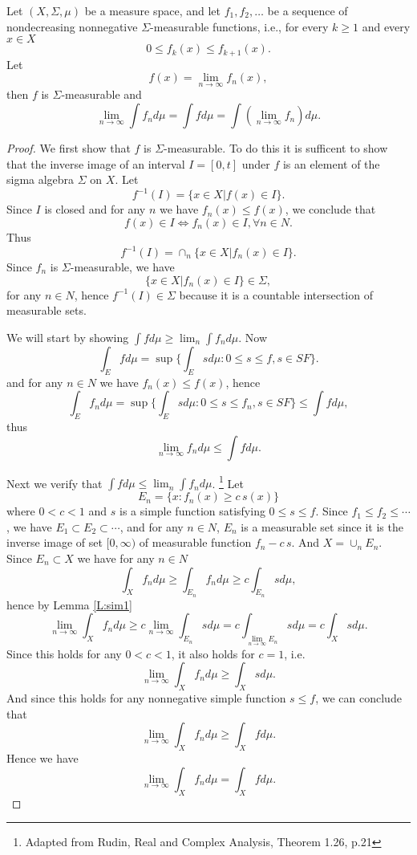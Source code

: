 \begin{theorem}  \label{T:MON}
Let $(X,\Sigma,\mu)$ be a measure space, and let $f_1,f_2,\dots$ be a sequence
of nondecreasing nonnegative $\Sigma$-measurable functions, i.e., for every 
$k\ge 1$ and every $x\in X$
\[
  0\le f_k(x) \le f_{k+1}(x).
\]
Let 
\[
  f(x) = \lim_{n\to\infty} f_n(x),
\]
then $f$ is $\Sigma$-measurable and
\begin{equation}
  \lim_{n\to\infty} \int f_n d\mu = \int f d\mu 
    = \int (\lim_{n\to\infty} f_n) d\mu.
\end{equation}
\end{theorem}
\begin{proof}
We first show that $f$ is $\Sigma$-measurable. To do this it is sufficent to 
show that the inverse image of an interval $I=[0,t]$ under $f$ is an element
of the sigma algebra $\Sigma$ on $X$. Let
\[
  f^{-1}(I) = \{ x\in X | f(x)\in I \}.
\]
Since $I$ is closed and for any $n$ we have $f_n(x)\le f(x)$, we conclude that
\[
  f(x) \in I  \Leftrightarrow  f_n(x)\in I, \forall n\in N.
\]
Thus
\[
  f^{-1}(I) = \cap_n \{ x\in X | f_n(x)\in I \}.
\]
Since $f_n$ is $\Sigma$-measurable, we have
\[
 \{ x\in X | f_n(x)\in I \} \in \Sigma,
\]
for any $n\in N$, hence $f^{-1}(I)\in \Sigma$ because it is a countable 
intersection of measurable sets.

We will start by showing $\int f d\mu \ge \lim_n \int f_n d\mu$. Now
\[
  \int_E f d\mu = \sup \{ \int_E s d\mu: 0\le s\le f, s \in SF \}.
\]
and for any $n\in N$ we have $f_n(x)\le f(x)$, hence
\[
  \int_E f_n d\mu = \sup \{ \int_E s d\mu: 0\le s\le f_n, s \in SF \}
                  \le \int f d\mu,
\]
thus
\[
  \lim_{n\to\infty} f_n d\mu \le \int f d\mu.
\]

Next we verify that $\int f d\mu \le \lim_n \int f_n d\mu$. 
\footnote{Adapted from Rudin, Real and Complex Analysis, Theorem 1.26, p.21}
Let
\[
  E_n = \{ x: f_n(x) \ge c \, s(x) \}
\]
where $0<c<1$ and $s$ is a simple function satisfying $0\le s\le f$.
Since $f_1\le f_2\le \cdots$, we have $E_1\subset E_2\subset \cdots$, and
for any $n\in N$, $E_n$ is a measurable set since it is the inverse image
of set $[0,\infty)$ of measurable function $f_n-c\, s$.
And $X=\cup_n E_n$.
Since $E_n\subset X$ we have for any $n\in N$
\[
  \int_X f_n d\mu \ge \int_{E_n} f_n d\mu \ge c \int_{E_n} s d\mu,
\]
hence by Lemma \ref{L:sim1}
\[
  \lim_{n\to\infty} \int_X f_n  d\mu
    \ge c \lim_{n\to\infty} \int_{E_n} s d\mu
    =   c \int_{\lim_{n\to\infty} E_n} s d\mu
    =   c \int_X s d\mu.
\]
Since this holds for any $0<c<1$, it also holds for $c=1$, i.e.
\[
  \lim_{n\to\infty} \int_X f_n  d\mu \ge \int_X s d\mu.
\]
And since this holds for any nonnegative simple function $s\le f$, we can
conclude that
\[
  \lim_{n\to\infty} \int_X f_n  d\mu \ge \int_X f d\mu.
\]
Hence we have
\[
  \lim_{n\to\infty} \int_X f_n  d\mu = \int_X f d\mu.
\]
\end{proof}

